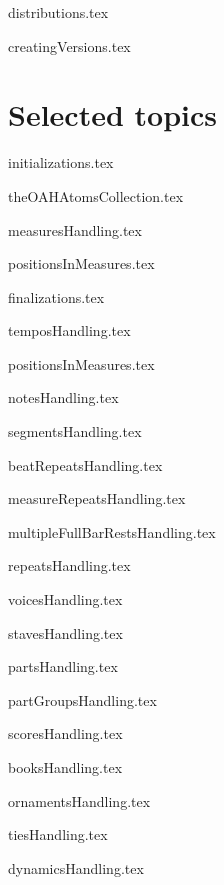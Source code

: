\documentclass[11pt,a4paper]{report}
\begin{document}
{distributions.tex}

{creatingVersions.tex}


\part{Selected topics}


{initializations.tex}



{theOAHAtomsCollection.tex}



{measuresHandling.tex}

{positionsInMeasures.tex}

{finalizations.tex}

{temposHandling.tex}

{positionsInMeasures.tex}

{notesHandling.tex}

{segmentsHandling.tex}

{beatRepeatsHandling.tex}

{measureRepeatsHandling.tex}

{multipleFullBarRestsHandling.tex}

{repeatsHandling.tex}

{voicesHandling.tex}

{stavesHandling.tex}

{partsHandling.tex}

{partGroupsHandling.tex}

{scoresHandling.tex}

{booksHandling.tex}

{ornamentsHandling.tex}

{tiesHandling.tex}

{dynamicsHandling.tex}
\end{document}
